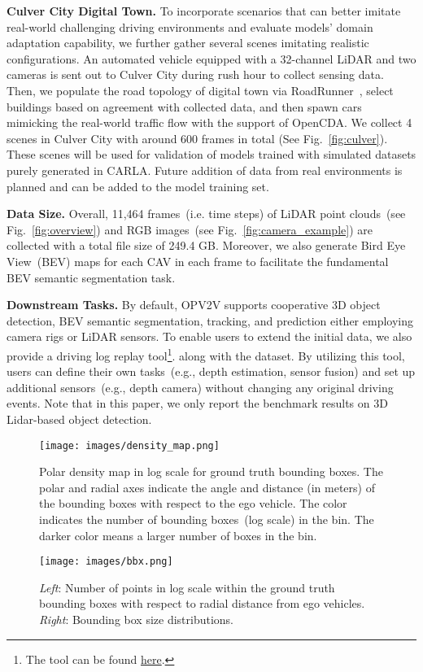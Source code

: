 \noindent\textbf{Culver City Digital Town.} To incorporate scenarios that can better imitate real-world challenging driving environments and evaluate models' domain adaptation capability, we further gather several scenes imitating realistic configurations. An automated vehicle equipped with a 32-channel LiDAR and two cameras is sent out to Culver City during rush hour to collect sensing data. Then, we populate the road topology of digital town via RoadRunner~\cite{roadrunner}, select buildings based on agreement with collected data, and then spawn cars mimicking the real-world traffic flow with the support of OpenCDA. We collect 4 scenes in Culver City with around 600 frames in total (See Fig.~\ref{fig:culver}). These scenes will be used for validation of models trained with simulated datasets purely generated in CARLA. Future addition of data from real environments is planned and can be added to the model training set.

\noindent\textbf{Data Size.} Overall, 11,464 frames~(i.e. time steps) of LiDAR point clouds~(see Fig.~\ref{fig:overview}) and RGB images~(see Fig.~\ref{fig:camera_example}) are collected with a total file size of 249.4 GB. Moreover, we also generate Bird Eye View~(BEV) maps for each CAV in each frame to facilitate the fundamental BEV semantic segmentation task.

\noindent\textbf{Downstream Tasks.} By default, OPV2V supports cooperative 3D object detection, BEV semantic segmentation, tracking, and prediction either employing camera rigs or LiDAR sensors. To enable users to extend the initial data, we also provide a driving log replay tool\footnote{The tool can be found  \textcolor{blue}{\href{https://github.com/DerrickXuNu/OpenCOOD/tree/feature/log_replay/logreplay}{here}}.}.  along with the dataset. By utilizing this tool, users can define their own tasks~(e.g., depth estimation, sensor fusion) and set up additional sensors~(e.g., depth camera) without changing any original driving events. Note that in this paper, we only report the benchmark results on 3D Lidar-based object detection.

\begin{figure}
    \centering
    \texttt{[image: images/density\_map.png]}
    \caption{Polar density map in log scale for ground truth bounding boxes. The polar and radial axes indicate the angle and distance (in meters) of the bounding boxes with respect to the ego vehicle. The color indicates the number of bounding boxes~(log scale) in the bin. The darker color means a larger number of boxes in the bin.}
    \label{fig:angle_density_map}
\end{figure}
\begin{figure}
    \centering
    \texttt{[image: images/bbx.png]}
    \caption{\emph{Left}: Number of points in log scale within the ground truth bounding boxes with respect to radial distance from ego vehicles. \emph{Right}: Bounding box size distributions. }
    \label{fig:bbx_dist}
\end{figure}

